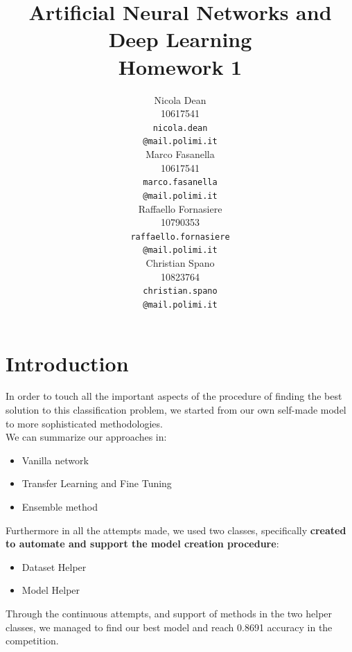 \documentclass[10pt]{article}
\title{Artificial Neural Networks and Deep Learning \\
Homework 1}
\author{
  Nicola Dean \\
  10617541 \\
  {\tt nicola.dean \\
  \tt @mail.polimi.it} \\\And
  Marco Fasanella \\
  10617541 \\
  {\tt marco.fasanella \\
  \tt @mail.polimi.it} \\\And
  Raffaello Fornasiere \\
    10790353 \\
    {\tt raffaello.fornasiere \\
    \tt @mail.polimi.it} \\\And
  Christian Spano \\
  10823764 \\
  {\tt christian.spano \\
  \tt @mail.polimi.it} \\}
\date{}
\begin{document}
\maketitle



\section{Introduction}
In order to touch all the important aspects of the procedure of finding the best solution to this classification problem,
we started from our own self-made model to more sophisticated methodologies.\\
 We can summarize our approaches in:
\begin{itemize}
  \item Vanilla network
  \item Transfer Learning and Fine Tuning
  \item Ensemble method
\end{itemize}
Furthermore in all the attempts made, we used two classes, specifically \textbf{created to automate and support the model creation
procedure}:
\begin{itemize}
  \item Dataset Helper
  \item Model Helper
\end{itemize}
Through the continuous attempts, and support of methods in the two helper classes, we managed to find our best model and
reach 0.8691 accuracy in the competition.
\end{document}

